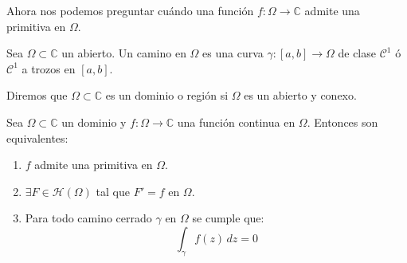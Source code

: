Ahora nos podemos preguntar cuándo una función $f: \Omega \to \mathbb{C}$ admite una primitiva en $\Omega$.

\begin{definición}
    Sea $\Omega \subset \mathbb{C}$ un abierto. Un camino en $\Omega$ es una curva $\gamma: [a, b] \to \Omega$ de clase $\mathcal{C}^1$ ó $\mathcal{C}^1$ a trozos en $[a, b]$.
\end{definición}

\begin{definición}
    Diremos que $\Omega \subset \mathbb{C}$ es un dominio o región si $\Omega$ es un abierto y conexo.
\end{definición}

\begin{teorema}
    Sea $\Omega \subset \mathbb{C}$ un dominio y $f: \Omega \to \mathbb{C}$ una función continua en $\Omega$. Entonces son equivalentes:
    \begin{enumerate}
        \item $f$ admite una primitiva en $\Omega$.
        \item $\exists F \in \mathcal{H}(\Omega)$ tal que $F' = f$ en $\Omega$.
        \item Para todo camino cerrado $\gamma$ en $\Omega$ se cumple que:
        \[
            \int_\gamma f(z) \, dz = 0
        \]
    \end{enumerate} \label{teo:existencia-primitivas}
\end{teorema}

